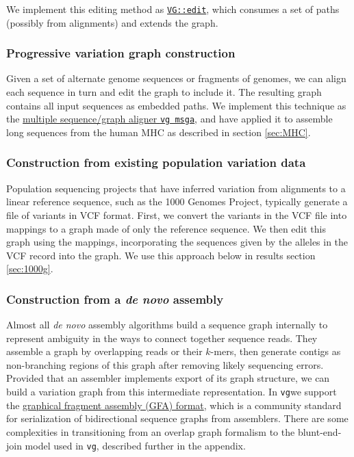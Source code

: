 \documentclass[12pt]{article}
\newcommand{\vg}{{\tt vg}}
\begin{document}
We implement this editing method as \href{https://github.com/vgteam/vg/blob/fbcb6e62/src/vg.cpp#L4846-L4912}{{\tt VG::edit}}, which consumes a set of paths (possibly from alignments) and extends the graph.

\subsubsection{Progressive variation graph construction}

Given a set of alternate genome sequences or fragments of genomes, we can align each sequence in turn and edit the graph to include it.
The resulting graph contains all input sequences as embedded paths.
We implement this technique as the \href{https://github.com/vgteam/vg/blob/fbcb6e62/src/main.cpp#L674-L1248}{multiple sequence/graph aligner {\tt vg msga}}, and have applied it to assemble long sequences from the human MHC as described in section \ref{sec:MHC}.

\subsubsection{Construction from existing population variation data}

Population sequencing projects that have inferred variation from alignments to a linear reference sequence, such as the 1000 Genomes Project, typically generate a file of variants in VCF format.
First, we convert the variants in the VCF file into mappings to a graph made of only the reference sequence. 
We then edit this graph using the mappings, incorporating the sequences given by the alleles in the VCF record into the graph. 
We use this approach below in results section \ref{sec:1000g}.

\subsubsection{Construction from a \emph{de novo} assembly}

Almost all \emph{de novo} assembly algorithms build a sequence graph internally to represent ambiguity in the ways to connect together sequence reads.
They assemble a graph by overlapping reads or their $k$-mers, then generate contigs as non-branching regions of this graph after removing likely sequencing errors.
Provided that an assembler implements export of its graph structure, we can build a variation graph from this intermediate representation.
In \vg we support the \href{https://github.com/pmelsted/GFA-spec}{graphical fragment assembly (GFA) format}, which is a community standard for serialization of bidirectional sequence graphs from assemblers.  There are some complexities in transitioning from an overlap graph formalism to the blunt-end-join model used in \vg, described further in the appendix.
\end{document}
